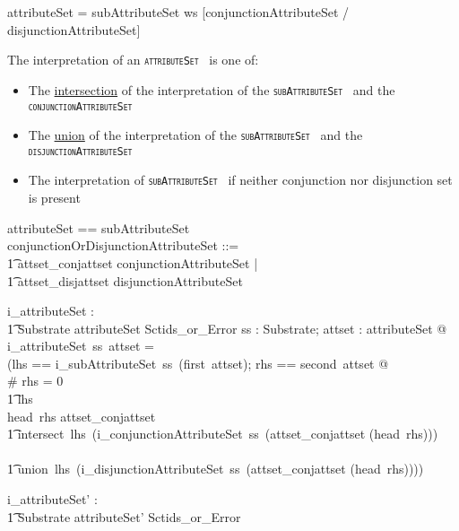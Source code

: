 \documentclass{article}
\def\spec#1{{\tt \small \textsc{{#1}} }}
\def\bnf#1{{\scriptsize {{#1}} }}
\begin{document}
\begin{framed}
\noindent
\bnf{attributeSet = subAttributeSet ws [conjunctionAttributeSet / disjunctionAttributeSet]}
\end{framed}

The interpretation of an \spec{attributeSet} is one of:
\begin{itemize}[noitemsep,nolistsep]
\item The \underline{intersection} of the interpretation of the \spec{subAttributeSet} and the \spec{conjunctionAttributeSet}
\item The \underline{union} of the interpretation of the \spec{subAttributeSet} and the \spec{disjunctionAttributeSet}
\item The interpretation of  \spec{subAttributeSet} if neither conjunction nor disjunction set is present
\end{itemize}


\begin{zed}
attributeSet == subAttributeSet \cross \optional[conjunctionOrDisjunctionAttributeSet] \\
[attributeSet']
\also
conjunctionOrDisjunctionAttributeSet ::= \\
\t1 attset\_conjattset \ldata conjunctionAttributeSet \rdata | \\
\t1 attset\_disjattset \ldata disjunctionAttributeSet \rdata
\end{zed}

\begin{axdef}
   i\_attributeSet : \\
\t1 Substrate \fun attributeSet \fun Sctids\_or\_Error
\where
   \forall ss : Substrate; attset : attributeSet @ \\
   i\_attributeSet~ss~attset = \\
   (\LET lhs == i\_subAttributeSet~ss~(first~attset); rhs == second~attset @ \\
 \IF \# rhs = 0 \THEN \\
 \t1 lhs \\
 \ELSE \IF head~rhs \in \ran attset\_conjattset \THEN \\
 \t1  intersect~lhs~(i\_conjunctionAttributeSet~ss~(attset\_conjattset \inv (head~rhs))) \\
  \ELSE \\
  \t1 union~lhs~(i\_disjunctionAttributeSet~ss~(attset\_conjattset \inv (head~rhs))))
\end{axdef}

\begin{axdef}
   i\_attributeSet' : \\
\t1 Substrate \fun attributeSet' \fun Sctids\_or\_Error
\end{axdef}
\end{document}
